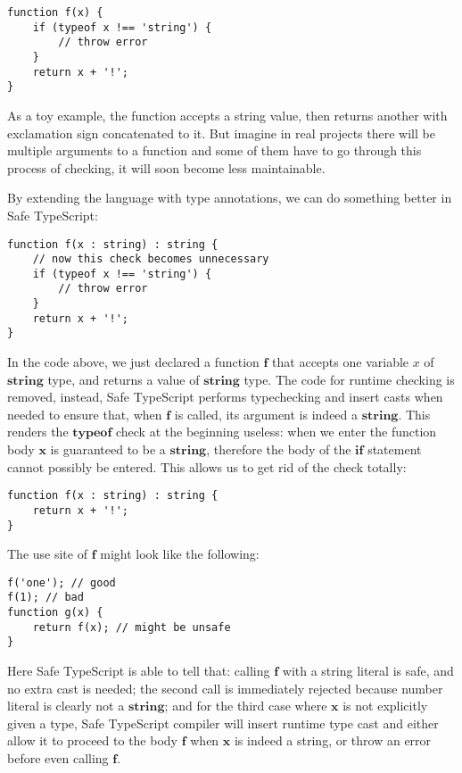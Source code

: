 \begin{verbatim}
function f(x) {
    if (typeof x !== 'string') {
        // throw error
    }
    return x + '!';
}
\end{verbatim}

As a toy example, the function accepts a string value,
then returns another with exclamation sign concatenated to it. 
But imagine in real projects there will be multiple arguments to a function
and some of them have to go through this process of checking,
it will soon become less maintainable.

By extending the language with type annotations,
we can do something better in Safe TypeScript:

\begin{verbatim}
function f(x : string) : string {
    // now this check becomes unnecessary
    if (typeof x !== 'string') {
        // throw error
    }
    return x + '!';
}
\end{verbatim}

In the code above, we just declared a function $\textbf{f}$ that accepts
one variable $x$ of $\textbf{string}$ type, and returns a value of $\textbf{string}$ type.
The code for runtime checking is removed, instead, Safe TypeScript performs typechecking
and insert casts when needed to ensure that,
when $\textbf{f}$ is called, its argument is indeed a $\textbf{string}$.
This renders the  $\textbf{typeof}$ check at the beginning useless:
when we enter the function body $\textbf{x}$ is guaranteed to be a $\textbf{string}$,
therefore the body of the $\textbf{if}$ statement cannot possibly be entered.
This allows us to get rid of the check totally:


\begin{verbatim}
function f(x : string) : string {
    return x + '!';
}
\end{verbatim}

The use site of $\textbf{f}$ might look like the following:

\begin{verbatim}
f('one'); // good
f(1); // bad
function g(x) {
    return f(x); // might be unsafe
}
\end{verbatim}

Here Safe TypeScript is able to tell that: calling $\textbf{f}$ with a string literal
is safe, and no extra cast is needed; the second call is immediately rejected
because number literal is clearly not a $\textbf{string}$;
and for the third case where $\textbf{x}$
is not explicitly given a type, Safe TypeScript compiler will insert runtime type cast
and either allow it to proceed to the body $\textbf{f}$ when $\textbf{x}$ is indeed a string,
or throw an error before even calling $\textbf{f}$.

